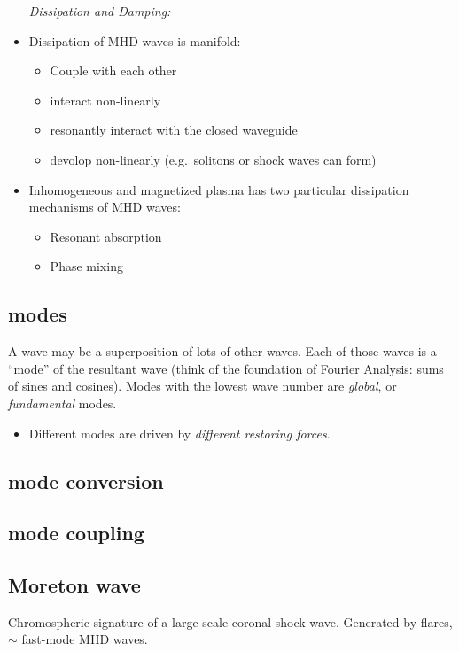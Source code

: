 \documentclass{article}
\begin{document}
\begin{itemize}
\emph{Dissipation and Damping:}

    \item Dissipation of MHD waves is manifold:
        \begin{itemize}
            \item Couple with each other
            \item interact non-linearly
            \item resonantly interact with the closed waveguide
            \item devolop non-linearly (e.g.\ solitons or shock waves
                can form)
        \end{itemize}
    \item Inhomogeneous and magnetized plasma has two particular
        dissipation mechanisms of MHD waves:
        \begin{itemize}
            \item Resonant absorption
            \item Phase mixing
        \end{itemize}
\end{itemize}


\subsection{modes}
A wave may be a superposition of lots of other waves. Each of those
waves is a ``mode'' of the resultant wave (think of the foundation
of Fourier Analysis: sums of sines and cosines).
Modes with the lowest wave number are \emph{global}, or
\emph{fundamental} modes.
\begin{itemize}
    \item Different modes are driven by \emph{different restoring forces}.
\end{itemize}

\subsection{mode conversion}
\subsection{mode coupling}

\subsection{Moreton wave}
Chromospheric signature of a large-scale coronal shock wave. Generated
by flares, $\sim$ fast-mode MHD waves.
\end{document}

